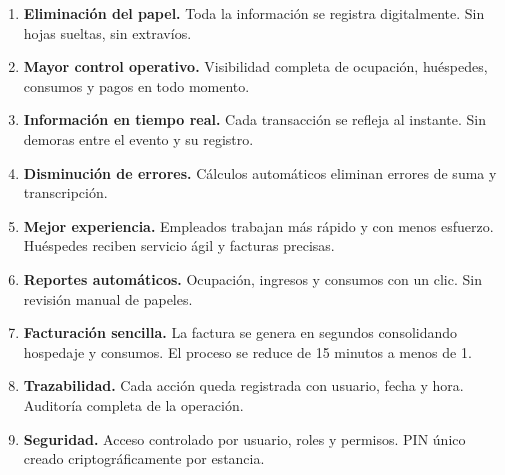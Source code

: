\documentclass[12pt,a4paper]{article}
\begin{document}
\begin{enumerate}[leftmargin=*]
    \item \textbf{Eliminación del papel.} Toda la información se registra digitalmente. Sin hojas sueltas, sin extravíos.
    \item \textbf{Mayor control operativo.} Visibilidad completa de ocupación, huéspedes, consumos y pagos en todo momento.
    \item \textbf{Información en tiempo real.} Cada transacción se refleja al instante. Sin demoras entre el evento y su registro.
    \item \textbf{Disminución de errores.} Cálculos automáticos eliminan errores de suma y transcripción.
    \item \textbf{Mejor experiencia.} Empleados trabajan más rápido y con menos esfuerzo. Huéspedes reciben servicio ágil y facturas precisas.
    \item \textbf{Reportes automáticos.} Ocupación, ingresos y consumos con un clic. Sin revisión manual de papeles.
    \item \textbf{Facturación sencilla.} La factura se genera en segundos consolidando hospedaje y consumos. El proceso se reduce de 15 minutos a menos de 1.
    \item \textbf{Trazabilidad.} Cada acción queda registrada con usuario, fecha y hora. Auditoría completa de la operación.
    \item \textbf{Seguridad.} Acceso controlado por usuario, roles y permisos. PIN único creado criptográficamente por estancia.
\end{enumerate}
\end{document}
